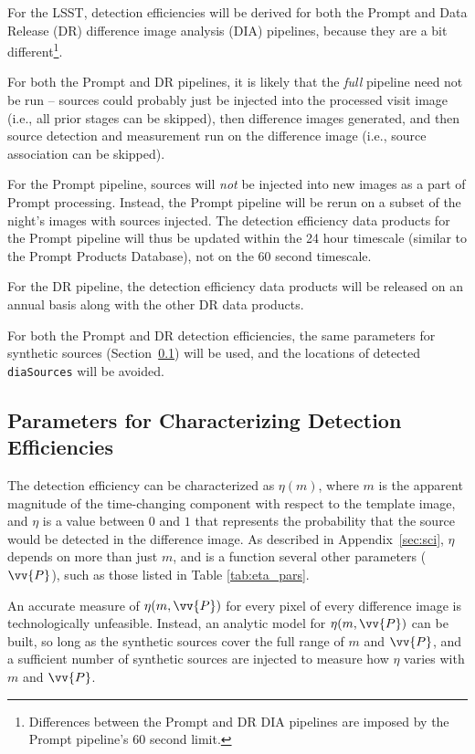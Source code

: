 \documentclass[DM,authoryear,toc]{lsstdoc}
\begin{document}
For the LSST, detection efficiencies will be derived for both the Prompt and Data Release (DR) difference image analysis (DIA) pipelines, because they are a bit different\footnote{Differences between the Prompt and DR DIA pipelines are imposed by the Prompt pipeline's 60 second limit.}.

For both the Prompt and DR pipelines, it is likely that the {\it full} pipeline need not be run -- sources could probably just be injected into the processed visit image (i.e., all prior stages can be skipped), then difference images generated, and then source detection and measurement run on the difference image (i.e., source association can be skipped).

For the Prompt pipeline, sources will \emph{not} be injected into new images as a part of Prompt processing.
Instead, the Prompt pipeline will be rerun on a subset of the night's images with sources injected.
The detection efficiency data products for the Prompt pipeline will thus be updated within the 24 hour timescale (similar to the Prompt Products Database), not on the 60 second timescale.

For the DR pipeline, the detection efficiency data products will be released on an annual basis along with the other DR data products.

For both the Prompt and DR detection efficiencies, the same parameters for synthetic sources (Section~\ref{ssec:dedp_pars}) will be used, and the locations of detected {\tt diaSources} will be avoided. 



\subsection{Parameters for Characterizing Detection Efficiencies}\label{ssec:dedp_pars}

The detection efficiency can be characterized as $\eta(m)$, where $m$ is the apparent magnitude of the time-changing component with respect to the template image, and $\eta$ is a value between $0$ and $1$ that represents the probability that the source would be detected in the difference image.
As described in Appendix~\ref{sec:sci}, $\eta$ depends on more than just $m$, and is a function several other parameters ($\vv{P}$), such as those listed in Table \ref{tab:eta_pars}.

An accurate measure of $\eta(m,\vv{P})$ for every pixel of every difference image is technologically unfeasible.
Instead, an analytic model for $\eta(m,\vv{P})$ can be built, so long as the synthetic sources cover the full range of $m$ and $\vv{P}$, and a sufficient number of synthetic sources are injected to measure how $\eta$ varies with $m$ and $\vv{P}$.
\end{document}
